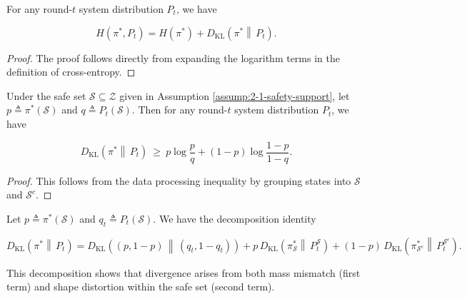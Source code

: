 \begin{lemma}\label{lem:2-1-cross-entropy-decomposition}

For any round-$t$ system distribution $P_t$, we have

\[
H(\pi^\ast,P_t)=H(\pi^\ast)+D_{\mathrm{KL}}\!\left(\pi^\ast \middle\|\, P_t\right).
\]

\begin{proof}
The proof follows directly from expanding the logarithm terms in the definition of cross-entropy.
\end{proof}
\end{lemma}

\begin{lemma}\label{lem:2-2-kl-lower-bound-by-safe-mass}

Under the safe set $\mathcal{S}\subseteq\mathcal{Z}$ given in Assumption \ref{assump:2-1-safety-support}, let $p\triangleq \pi^\ast(\mathcal{S})$ and $q\triangleq P_t(\mathcal{S})$. Then for any round-$t$ system distribution $P_t$, we have

\[
D_{\mathrm{KL}}\!\left(\pi^\ast \middle\|\, P_t\right)\ \ge\ p\log\frac{p}{q}+(1-p)\log\frac{1-p}{1-q}.
\]

\begin{proof}
This follows from the data processing inequality by grouping states into $\mathcal{S}$ and $\mathcal{S}^c$.
\end{proof}
\end{lemma}

\begin{lemma}\label{lem:2-5-kl-decomposition-by-safe-set}

Let $p\triangleq \pi^\ast(\mathcal{S})$ and $q_t\triangleq P_t(\mathcal{S})$. We have the decomposition identity

\[
D_{\mathrm{KL}}\!\left(\pi^\ast \middle\|\, P_t\right)=D_{\mathrm{KL}}\!\left((p,1-p)\,\middle\|\,(q_t,1-q_t)\right) + p\,D_{\mathrm{KL}}\!\left(\pi^\ast_{\mathcal{S}} \middle\|\, P^{\mathcal{S}}_t\right)+ (1-p)\,D_{\mathrm{KL}}\!\left(\pi^\ast_{\mathcal{S}^c} \middle\|\, P^{\mathcal{S}^c}_t\right).
\]

This decomposition shows that divergence arises from both mass mismatch (first term) and shape distortion within the safe set (second term).
\end{lemma}

